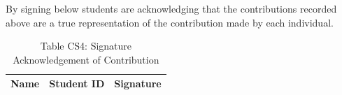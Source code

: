 \documentclass[11pt,a4paper]{report}
\renewcommand{\arraystretch}{0.9}
\newif\ifPrismMainMatter
\newif\ifPrismIntroduction
\newif\ifPrismLiteratureReview
\newif\ifPrismTheory
\newif\ifPrismMethods
\newif\ifshowchapterheader
\begin{document}
By signing below students are acknowledging that the contributions recorded above are a true representation of the contribution made by each individual.

\begin{table}[!htbp]
\centering
\caption*{Table CS4: Signature Acknowledgement of Contribution}
\label{tab:signature-acknowledgement}
\renewcommand{\arraystretch}{2.0}
\begin{tabularx}{\textwidth}{@{}>{\raggedright\arraybackslash}p{} >{\raggedright\arraybackslash}p{} X@{}}
\toprule
\textbf{Name} & \textbf{Student ID} & \textbf{Signature} \\
\midrule
\bottomrule
\end{tabularx}
\end{table}


\fi



% 

% 

% 

\ifPrismMethods
\setcounter{chapter}{3}
\chapter{Methods, Results and Discussion}
\label{ch:methods}

\fi
\end{document}
